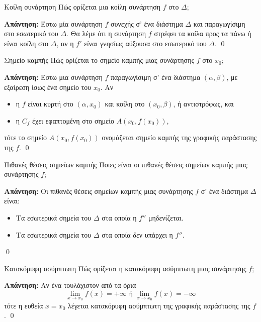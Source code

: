 \documentclass[a4paper, 12pt]{article}
\renewenvironment{proof}[1][\textbf{Απάντηση}]{%
  \par\noindent\textbf{#1:} \rmfamily}{\qed\par}
\begin{document}
\begin{theorem}{Κοίλη συνάρτηση}
  Πώς ορίζεται μια κοίλη συνάρτηση $f$ στο $Δ$;
\end{theorem}
\begin{proof}
  Έστω μία συνάρτηση $f$ συνεχής σ' ένα διάστημα $Δ$ και παραγωγίσιμη στο εσωτερικό του $Δ$. Θα λέμε ότι η συνάρτηση $f$ στρέφει τα κοίλα προς τα πάνω ή είναι κοίλη στο $Δ$, αν η $f '$ είναι γνησίως αύξουσα στο εσωτερικό του $Δ$.
\end{proof}

\begin{theorem}{Σημείο καμπής}
  Πώς ορίζεται το σημείο καμπής μιας συνάρτησης $f$ στο $x_0$;
\end{theorem}
\begin{proof}
  Έστω μια συνάρτηση $f$ παραγωγίσιμη σ’ ένα διάστημα $(α, β)$, με εξαίρεση ίσως ένα
  σημείο του $x_0$. Αν
  \begin{itemize}
    \item η $f$ είναι κυρτή στο $(α, x_0)$ και κοίλη στο $(x_0, β)$, ή αντιστρόφως, και
    \item η $C_f$ έχει εφαπτομένη στο σημείο $A(x_0, f(x_0))$,
  \end{itemize}
  τότε το σημείο $A(x_0, f(x_0))$ ονομάζεται σημείο καμπής της γραφικής παράστασης
  της $f$.
\end{proof}

\begin{theorem}{Πιθανές θέσεις σημείων καμπής}
  Ποιες είναι οι πιθανές θέσεις σημείων καμπής μιας συνάρτησης $f$;
\end{theorem}
\begin{proof}
  Οι πιθανές θέσεις σημείων καμπής μιας συνάρτησης $f$ σ’ ένα διάστημα $Δ$ είναι:
  \begin{itemize}
    \item Τα εσωτερικά σημεία του $Δ$ στα οποία η $f ''$ μηδενίζεται.
    \item Τα εσωτερικά σημεία του $Δ$ στα οποία δεν υπάρχει η $f ''$.
  \end{itemize}
\end{proof}

\begin{theorem}{Κατακόρυφη ασύμπτωτη}
  Πώς ορίζεται η κατακόρυφη ασύμπτωτη μιας συνάρτησης $f$;
\end{theorem}
\begin{proof}
  Αν ένα τουλάχιστον από τα όρια
  $$\lim_{x \to x_0} f ( x) = +\infty \text{ ή } \lim_{x \to x_0} f ( x) = −\infty$$
  τότε η ευθεία $x = x_0$ λέγεται κατακόρυφη ασύμπτωτη της γραφικής παράστασης της $f$.
\end{proof}
\end{document}
